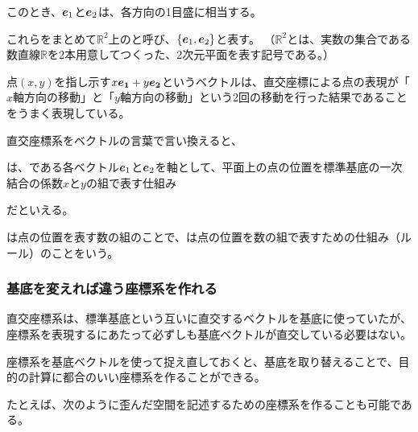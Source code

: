 \documentclass[../../imaging-math]{subfiles}
\begin{document}
このとき、$\vb*{e}_1$と$\vb*{e}_2$は、各方向の1目盛に相当する。

これらをまとめて$\mathbb{R}^2$上のと呼び、$\left\{ \vb*{e}_1, \vb*{e}_2 \right\}$と表す。
（$\mathbb{R}^2$とは、実数の集合である数直線$\mathbb{R}$を2本用意してつくった、2次元平面を表す記号である。）

\br

点$(x,y)$を指し示す$x\vb*{e_1}+y\vb*{e_2}$というベクトルは、直交座標による点の表現が「$x$軸方向の移動」と「$y$軸方向の移動」という2回の移動を行った結果であることをうまく表現している。

\br

直交座標系をベクトルの言葉で言い換えると、
\begin{emphabox}
  は、である各ベクトル$\vb*{e}_1$と$\vb*{e}_2$を軸として、平面上の点の位置を標準基底の一次結合の係数$x$と$y$の組で表す仕組み
\end{emphabox}
だといえる。

\begin{supplnote}
  は点の位置を表す数の組のことで、は点の位置を数の組で表すための仕組み（ルール）のことをいう。
\end{supplnote}

\subsubsection{基底を変えれば違う座標系を作れる}

直交座標系は、標準基底という互いに直交するベクトルを基底に使っていたが、座標系を表現するにあたって必ずしも基底ベクトルが直交している必要はない。

\br

座標系を基底ベクトルを使って捉え直しておくと、基底を取り替えることで、目的の計算に都合のいい座標系を作ることができる。

たとえば、次のように歪んだ空間を記述するための座標系を作ることも可能である。
\end{document}
